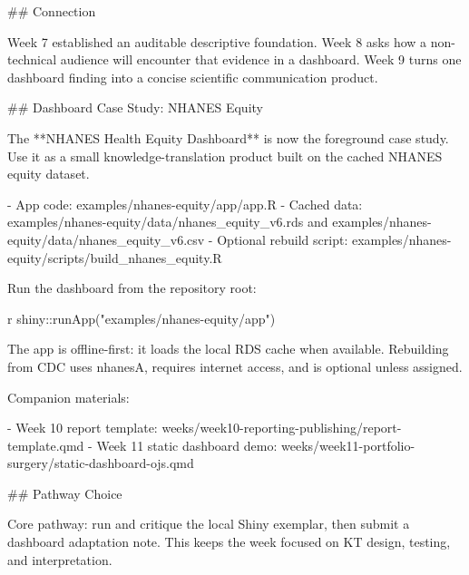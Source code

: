 \documentclass[
  letterpaper,
  DIV=11,
  numbers=noendperiod,
  oneside]{scrreprt}
\newenvironment{Shaded}{\begin{snugshade}}{\end{snugshade}}
\newcommand{\FunctionTok}[1]{\textcolor[rgb]{0.28,0.35,0.67}{#1}}
\newcommand{\InformationTok}[1]{\textcolor[rgb]{0.37,0.37,0.37}{#1}}
\newcommand{\NormalTok}[1]{\textcolor[rgb]{0.00,0.23,0.31}{#1}}
\newcommand{\SpecialCharTok}[1]{\textcolor[rgb]{0.37,0.37,0.37}{#1}}
\newcommand{\SpecialStringTok}[1]{\textcolor[rgb]{0.13,0.47,0.30}{#1}}
\newcommand{\StringTok}[1]{\textcolor[rgb]{0.13,0.47,0.30}{#1}}
\begin{document}
\begin{Shaded}
\begin{Highlighting}[numbers=left,,]
\FunctionTok{\#\# Connection}

\NormalTok{Week 7 established an auditable descriptive foundation. Week 8 asks how a non{-}technical audience will encounter that evidence in a dashboard. Week 9 turns one dashboard finding into a concise scientific communication product.}

\FunctionTok{\#\# Dashboard Case Study: NHANES Equity}

\NormalTok{The **NHANES Health Equity Dashboard** is now the foreground case study. Use it as a small knowledge{-}translation product built on the cached NHANES equity dataset.}

\SpecialStringTok{{-} }\NormalTok{App code: }\InformationTok{\textasciigrave{}examples/nhanes{-}equity/app/app.R\textasciigrave{}}
\SpecialStringTok{{-} }\NormalTok{Cached data: }\InformationTok{\textasciigrave{}examples/nhanes{-}equity/data/nhanes\_equity\_v6.rds\textasciigrave{}}\NormalTok{ and }\InformationTok{\textasciigrave{}examples/nhanes{-}equity/data/nhanes\_equity\_v6.csv\textasciigrave{}}
\SpecialStringTok{{-} }\NormalTok{Optional rebuild script: }\InformationTok{\textasciigrave{}examples/nhanes{-}equity/scripts/build\_nhanes\_equity.R\textasciigrave{}}

\NormalTok{Run the dashboard from the repository root:}

\InformationTok{\textasciigrave{}\textasciigrave{}\textasciigrave{}r}
\NormalTok{shiny}\SpecialCharTok{::}\FunctionTok{runApp}\NormalTok{(}\StringTok{"examples/nhanes{-}equity/app"}\NormalTok{)}
\InformationTok{\textasciigrave{}\textasciigrave{}\textasciigrave{}}

\NormalTok{The app is offline{-}first: it loads the local RDS cache when available. Rebuilding from CDC uses }\InformationTok{\textasciigrave{}nhanesA\textasciigrave{}}\NormalTok{, requires internet access, and is optional unless assigned.}

\NormalTok{Companion materials:}

\SpecialStringTok{{-} }\NormalTok{Week 10 report template: }\InformationTok{\textasciigrave{}weeks/week10{-}reporting{-}publishing/report{-}template.qmd\textasciigrave{}}
\SpecialStringTok{{-} }\NormalTok{Week 11 static dashboard demo: }\InformationTok{\textasciigrave{}weeks/week11{-}portfolio{-}surgery/static{-}dashboard{-}ojs.qmd\textasciigrave{}}


\FunctionTok{\#\# Pathway Choice}

\NormalTok{Core pathway: run and critique the local Shiny exemplar, then submit a dashboard adaptation note. This keeps the week focused on KT design, testing, and interpretation.}


\end{Highlighting}
\end{Shaded}
\end{document}
